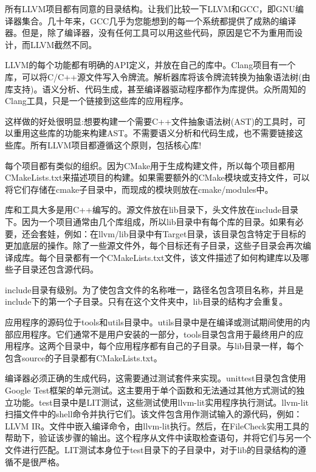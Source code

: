 所有LLVM项目都有同意的目录结构。让我们比较一下LLVM和GCC，即GNU编译器集合。几十年来，GCC几乎为您能想到的每一个系统都提供了成熟的编译器。但是，除了编译器，没有任何工具可以用这些代码，原因是它不为重用而设计，而LLVM截然不同。\par

LLVM的每个功能都有明确的API定义，并放在自己的库中。Clang项目有一个库，可以将C/C++源文件写入令牌流。解析器库将该令牌流转换为抽象语法树(由库支持)。语义分析、代码生成，甚至编译器驱动程序都作为库提供。众所周知的Clang工具，只是一个链接到这些库的应用程序。\par

这样做的好处很明显:想要构建一个需要C++文件抽象语法树(AST)的工具时，可以重用这些库的功能来构建AST。不需要语义分析和代码生成，也不需要链接这些库。所有LLVM项目都遵循这个原则，包括核心库!\par

每个项目都有类似的组织。因为CMake用于生成构建文件，所以每个项目都用CMakeLists.txt来描述项目的构建。如果需要额外的CMake模块或支持文件，可以将它们存储在cmake子目录中，而现成的模块则放在cmake/modules中。\par

库和工具大多是用C++编写的。源文件放在lib目录下，头文件放在include目录下。因为一个项目通常由几个库组成，所以lib目录中有每个库的目录。如果有必要，还会套娃，例如：在llvm/lib目录中有Target目录，该目录包含特定于目标的更加底层的操作。除了一些源文件外，每个目标还有子目录，这些子目录会再次编译成库。每个目录都有一个CMakeLists.txt文件，该文件描述了如何构建库以及哪些子目录还包含源代码。\par

include目录有级别。为了使包含文件的名称唯一，路径名包含项目名称，并且是include下的第一个子目录。只有在这个文件夹中，lib目录的结构才会重复。\par

应用程序的源码位于tools和utils目录中。utils目录中是在编译或测试期间使用的内部应用程序。它们通常不是用户安装的一部分，tools目录包含用于最终用户的应用程序。这两个目录中，每个应用程序都有自己的子目录。与lib目录一样，每个包含source的子目录都有CMakeLists.txt。\par

编译器必须正确的生成代码，这需要通过测试套件来实现。unittest目录包含使用Google Test框架的单元测试。这主要用于单个函数和无法通过其他方式测试的独立功能。test目录中是LIT测试，这些测试使用llvm-lit实用程序执行测试。llvm-lit扫描文件中的shell命令并执行它们。该文件包含用作测试输入的源代码，例如：LLVM IR。文件中嵌入编译命令，由llvm-lit执行。然后，在FileCheck实用工具的帮助下，验证该步骤的输出。这个程序从文件中读取检查语句，并将它们与另一个文件进行匹配。LIT测试本身位于test目录下的子目录中，对于lib的目录结构的遵循不是很严格。\par

